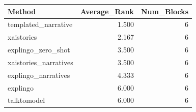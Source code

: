 \begin{tabular}{lrr}
\toprule
Method & Average_Rank & Num_Blocks \\
\midrule
templated_narrative & 1.500 & 6 \\
xaistories & 2.167 & 6 \\
explingo_zero_shot & 3.500 & 6 \\
xaistories_narratives & 3.500 & 6 \\
explingo_narratives & 4.333 & 6 \\
explingo & 6.000 & 6 \\
talktomodel & 6.000 & 6 \\
\bottomrule
\end{tabular}
